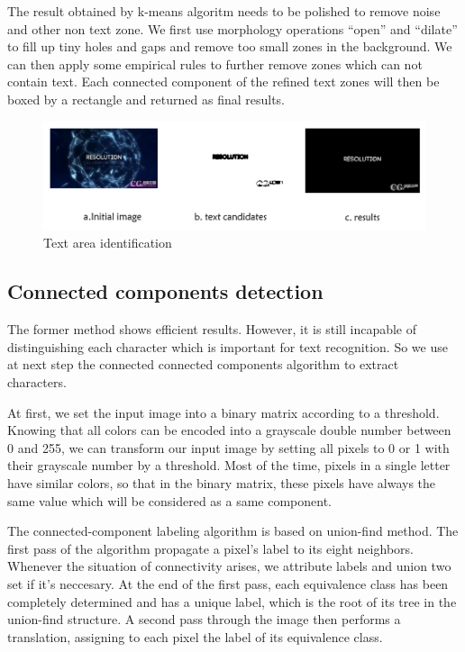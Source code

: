 \documentclass[paper=a4, french, 11pt]{scrartcl}
\begin{document}
The result obtained by k-means algoritm needs to be polished to remove noise and other non text zone. We first use morphology operations “open” and “dilate” to fill up tiny holes and gaps and remove too small zones in the background. We can then apply some empirical rules to further remove zones which can not contain text. Each connected component of the refined text zones will then be boxed by a rectangle and returned as final results.

\begin{figure}[h]
\begin{center}
   \includegraphics[width=0.9\linewidth]{text_area_example.png}
\end{center}
\vspace{-4ex}
\caption{Text area identification}
\label{fig:heatmap}
\end{figure}

\subsection{Connected components detection} \mbox{} \vspace{-0.5cm}

The former method shows efficient results. However, it is still incapable of distinguishing each character which is important for text recognition. So we use at next step the connected connected components algorithm to extract characters.

At first, we set the input image into a binary matrix according to a threshold. Knowing that all colors can be encoded into a grayscale double number between 0 and 255, we can transform our input image by setting all pixels to 0 or 1 with their grayscale number by a threshold. Most of the time, pixels in a single letter have similar colors, so that in the binary matrix, these pixels have always the same value which will be considered as a same component.

The connected-component labeling algorithm is based on union-find method. The first pass of the algorithm propagate a pixel's label to its eight neighbors. Whenever the situation of connectivity arises, we attribute labels and union two set if it's neccesary. At the end of the first pass, each equivalence class has been completely determined and has a unique label, which is the root of its tree in the union-find structure. A second pass through the image then performs a translation, assigning to each pixel the label of its equivalence class.
\end{document}
